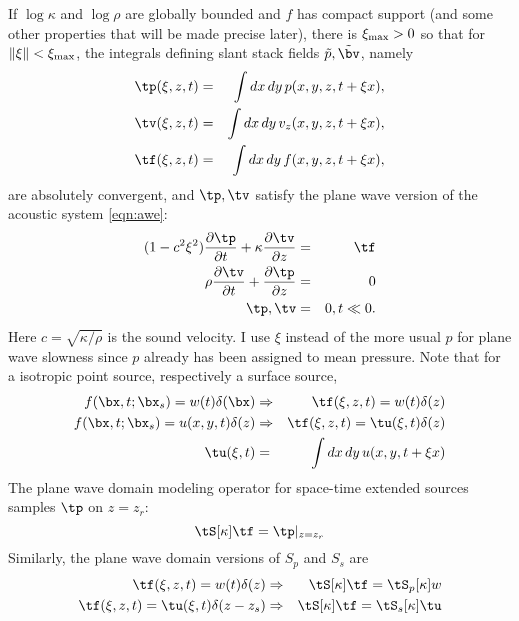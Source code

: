 If $\log \kappa$ and $\log \rho$ are globally bounded and $f$ has
compact support (and some other properties that will be made precise
later), there is $\xi_{\rm max} > 0$ so that for
$\|\xi\|<\xi_{\rm max}$, the integrals defining slant stack fields
$\tilde{p},\tilde{\bv}$, namely
\begin{eqnarray}
\label{eqn:slant}
\tp(\xi,z,t)& = &\int dx\, dy\, p(x,y,z,t+\xi x),\nonumber\\
\tv(\xi,z,t)&=&\int dx\, dy\, v_z(x,y,z,t+\xi x),\nonumber\\
\tf(\xi,z,t)&=&\int dx\,dy\, f(x,y,z,t+\xi x),
\end{eqnarray}
are absolutely convergent, and $\tp, \tv$ satisfy the plane wave
version of the acoustic system \ref{eqn:awe}:
\begin{eqnarray}
\label{eqn:awepw}
(1-c^2\xi^2)\frac{\partial \tp}{\partial t} + \kappa\frac{\partial
  \tv}{\partial z} &=& \tf \nonumber\\
\rho \frac{\partial \tv}{\partial t} + \frac{\partial \tp}{\partial
  z}&=&0\nonumber\\
\tp,\tv&=&0, t \ll 0.
\end{eqnarray}
Here $c=\sqrt{\kappa/\rho}$ is the sound velocity. I use $\xi$ instead
of the more usual $p$ for plane wave slowness since $p$ already has
been assigned to mean pressure. Note that for a isotropic point
source, respectively a surface source,
\begin{eqnarray}
  f(\bx,t;\bx_s)=w(t)\delta(\bx) & \Rightarrow &
                                               \tf(\xi,z,t)=w(t)\delta(z)\\ \nonumber 
  f(\bx,t;\bx_s) = u(x,y,t)\delta(z) & \Rightarrow &
                                                     \tf(\xi,z,t) =
                                                     \tu(\xi,t)\delta(z)\\
  \nonumber
  \tu(\xi,t) &=& \int dx\,dy\, u(x,y,t+\xi x)
\end{eqnarray}
The plane wave domain modeling
operator for space-time extended sources samples $\tp$ on $z=z_r$:
\begin{equation}
\label{eqn:modpw}
\tS[\kappa]\tf = \tp|_{z=z_r}
\end{equation}
Similarly, the plane wave domain versions of $S_p$ and $S_s$ are
\begin{eqnarray}
 \tf(\xi,z,t) = w(t)\delta(z) & \Rightarrow & \tS[\kappa]\tf = \tS_p
  [\kappa]w\\ \nonumber
  \label{eqn:specsrc}
\tf(\xi,z,t) = \tu(\xi,t)\delta(z-z_s) & \Rightarrow & \tS[\kappa]\tf =
  \tS_s[\kappa]\tu
\end{eqnarray}


